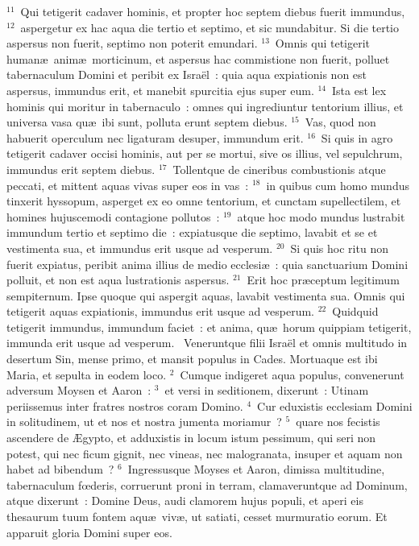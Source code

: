 ${}^{11}$~Qui tetigerit cadaver hominis, et propter hoc septem diebus fuerit immundus,
${}^{12}$~aspergetur ex hac aqua die tertio et septimo, et sic mundabitur. Si die tertio aspersus non fuerit, septimo non poterit emundari.
${}^{13}$~Omnis qui tetigerit human\ae\ anim\ae\ morticinum, et aspersus hac commistione non fuerit, polluet tabernaculum Domini et peribit ex Isra\"el~: quia aqua expiationis non est aspersus, immundus erit, et manebit spurcitia ejus super eum.
${}^{14}$~Ista est lex hominis qui moritur in tabernaculo~: omnes qui ingrediuntur tentorium illius, et universa vasa qu\ae\ ibi sunt, polluta erunt septem diebus.
${}^{15}$~Vas, quod non habuerit operculum nec ligaturam desuper, immundum erit.
${}^{16}$~Si quis in agro tetigerit cadaver occisi hominis, aut per se mortui, sive os illius, vel sepulchrum, immundus erit septem diebus.
${}^{17}$~Tollentque de cineribus combustionis atque peccati, et mittent aquas vivas super eos in vas~:
${}^{18}$~in quibus cum homo mundus tinxerit hyssopum, asperget ex eo omne tentorium, et cunctam supellectilem, et homines hujuscemodi contagione pollutos~:
${}^{19}$~atque hoc modo mundus lustrabit immundum tertio et septimo die~: expiatusque die septimo, lavabit et se et vestimenta sua, et immundus erit usque ad vesperum.
${}^{20}$~Si quis hoc ritu non fuerit expiatus, peribit anima illius de medio ecclesi\ae~: quia sanctuarium Domini polluit, et non est aqua lustrationis aspersus.
${}^{21}$~Erit hoc pr\ae ceptum legitimum sempiternum. Ipse quoque qui aspergit aquas, lavabit vestimenta sua. Omnis qui tetigerit aquas expiationis, immundus erit usque ad vesperum.
${}^{22}$~Quidquid tetigerit immundus, immundum faciet~: et anima, qu\ae\ horum quippiam tetigerit, immunda erit usque ad vesperum.
~\lettrine[lines=10,image=true,loversize=0.05,lraise=-0.03]{V}{}eneruntque filii Isra\"el et omnis multitudo in desertum Sin, mense primo, et mansit populus in Cades. Mortuaque est ibi Maria, et sepulta in eodem loco.
${}^{2}$~Cumque indigeret aqua populus, convenerunt adversum Moysen et Aaron~:
${}^{3}$~et versi in seditionem, dixerunt~: Utinam periissemus inter fratres nostros coram Domino.
${}^{4}$~Cur eduxistis ecclesiam Domini in solitudinem, ut et nos et nostra jumenta moriamur~?
${}^{5}$~quare nos fecistis ascendere de \AE gypto, et adduxistis in locum istum pessimum, qui seri non potest, qui nec ficum gignit, nec vineas, nec malogranata, insuper et aquam non habet ad bibendum~?
${}^{6}$~Ingressusque Moyses et Aaron, dimissa multitudine, tabernaculum fœderis, corruerunt proni in terram, clamaveruntque ad Dominum, atque dixerunt~: Domine Deus, audi clamorem hujus populi, et aperi eis thesaurum tuum fontem aqu\ae\ viv\ae , ut satiati, cesset murmuratio eorum. Et apparuit gloria Domini super eos.


